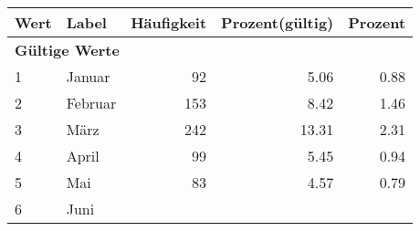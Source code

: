      \begin{longtable}{lXrrr}
     \toprule
     \textbf{Wert} & \textbf{Label} & \textbf{Häufigkeit} & \textbf{Prozent(gültig)} & \textbf{Prozent} \\
     \endhead
     \midrule
     \multicolumn{5}{l}{\textbf{Gültige Werte}}\\

     1 &
     \multicolumn{1}{X}{ Januar   } &


       \num{92} &
       \num[round-mode=places,round-precision=2]{5,06} &
         \num[round-mode=places,round-precision=2]{0,88} \\

     2 &
     \multicolumn{1}{X}{ Februar   } &


       \num{153} &
       \num[round-mode=places,round-precision=2]{8,42} &
         \num[round-mode=places,round-precision=2]{1,46} \\

     3 &
     \multicolumn{1}{X}{ März   } &


       \num{242} &
       \num[round-mode=places,round-precision=2]{13,31} &
         \num[round-mode=places,round-precision=2]{2,31} \\

     4 &
     \multicolumn{1}{X}{ April   } &


       \num{99} &
       \num[round-mode=places,round-precision=2]{5,45} &
         \num[round-mode=places,round-precision=2]{0,94} \\

     5 &
     \multicolumn{1}{X}{ Mai   } &


       \num{83} &
       \num[round-mode=places,round-precision=2]{4,57} &
         \num[round-mode=places,round-precision=2]{0,79} \\

     6 &
     \multicolumn{1}{X}{ Juni   } &



\end{longtable}
